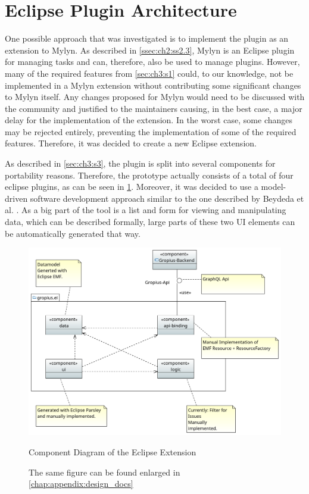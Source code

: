 \section{Eclipse Plugin Architecture}
\label{sec:ch4:s3}
One possible approach that was investigated is to implement the plugin as an extension to Mylyn.
As described in \cref{ssec:ch2:ss2.3}, Mylyn is an \gls{Eclipse} plugin for managing tasks and can, therefore, also be used to manage plugins.
However, many of the required features from \cref{sec:ch3:s1} could, to our knowledge, not be implemented in a Mylyn extension without contributing some significant changes to Mylyn itself.
Any changes proposed for Mylyn would need to be discussed with the community and justified to the maintainers causing, in the best case, a major delay for the implementation of the extension.
In the worst case, some changes may be rejected entirely, preventing the implementation of some of the required features.
Therefore, it was decided to create a new \gls{Eclipse} extension.

As described in \cref{sec:ch3:s3}, the plugin is split into several components for portability reasons.
Therefore, the prototype actually consists of a total of four eclipse plugins, as can be seen in \cref{fig:c4:component_diagram}.
Moreover, it was decided to use a model-driven software development approach similar to the one described by Beydeda et al. \cite{beydeda2005model}.
As a big part of the tool is a list and form for viewing and manipulating data, which can be described formally,
large parts of these two \gls{UI} elements can be automatically generated that way.

\begin{figure}[!h]
	\centering
	\includegraphics[width=\textwidth]{graphics/Component_Diagram.png}
	\caption{Component Diagram of the Eclipse Extension}
	\caption*{\footnotesize{The same figure can be found enlarged in \cref{chap:appendix:design_docs}}}
	\label{fig:c4:component_diagram}
\end{figure}

